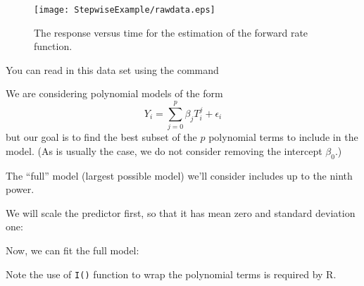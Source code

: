\documentclass{report}
\begin{document}
\begin{figure}[ht]
\begin{center}
\texttt{[image: StepwiseExample/rawdata.eps]}
\vspace{-.5in}
\caption{The response versus time for the estimation of the forward
rate function.}
\vspace{.1in}
\label{forrateraw}
\end{center}
\end{figure}

You can read in this data set using the command

\vspace{.2in}
\normalsize
{}

\Large

\newpage
We are considering polynomial models of the form
\[
   Y_i = \sum_{j=0}^p \beta_j T_i^j + \epsilon_i
\]
but our goal is to find the best subset of the $p$ polynomial terms to include
in the model. (As is usually the case, 
we do not consider removing the intercept $\beta_0$.)

The ``full'' model (largest possible model) we'll consider includes up to
the ninth power.



We will scale the predictor first, so that it has mean zero and 
standard deviation one:


Now, we can fit the full model:


Note the use of {\tt I()} function to wrap the polynomial terms is required by R.

\newpage
\end{document}

